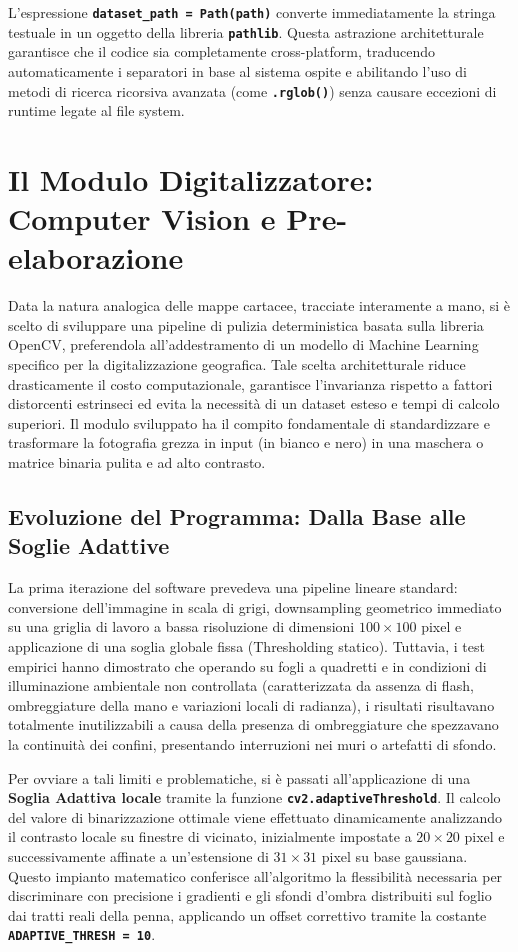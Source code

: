 \documentclass[12pt,a4paper]{article}
\begin{document}
    L'espressione \textbf{\texttt{dataset\_path = Path(path)}} converte immediatamente la stringa testuale in un oggetto della libreria \textbf{\texttt{pathlib}}. Questa astrazione architetturale garantisce che il codice sia completamente cross-platform, traducendo automaticamente i separatori in base al sistema ospite e abilitando l'uso di metodi di ricerca ricorsiva avanzata (come \textbf{\texttt{.rglob()}}) senza causare eccezioni di runtime legate al file system.

    \section{Il Modulo Digitalizzatore: Computer Vision e Pre-elaborazione}
    Data la natura analogica delle mappe cartacee, tracciate interamente a mano, si è scelto di sviluppare una pipeline di pulizia deterministica basata sulla libreria OpenCV, preferendola all'addestramento di un modello di Machine Learning specifico per la digitalizzazione geografica. Tale scelta architetturale riduce drasticamente il costo computazionale, garantisce l'invarianza rispetto a fattori distorcenti estrinseci ed evita la necessità di un dataset esteso e tempi di calcolo superiori. Il modulo sviluppato ha il compito fondamentale di standardizzare e trasformare la fotografia grezza in input (in bianco e nero) in una maschera o matrice binaria pulita e ad alto contrasto.

    \subsection{Evoluzione del Programma: Dalla Base alle Soglie Adattive}
    La prima iterazione del software prevedeva una pipeline lineare standard: conversione dell'immagine in scala di grigi, downsampling geometrico immediato su una griglia di lavoro a bassa risoluzione di dimensioni $100 \times 100$ pixel e applicazione di una soglia globale fissa (Thresholding statico). Tuttavia, i test empirici hanno dimostrato che operando su fogli a quadretti e in condizioni di illuminazione ambientale non controllata (caratterizzata da assenza di flash, ombreggiature della mano e variazioni locali di radianza), i risultati risultavano totalmente inutilizzabili a causa della presenza di ombreggiature che spezzavano la continuità dei confini, presentando interruzioni nei muri o artefatti di sfondo.
    \medskip

    Per ovviare a tali limiti e problematiche, si è passati all'applicazione di una \textbf{Soglia Adattiva locale} tramite la funzione \textbf{\texttt{cv2.adaptiveThreshold}}. Il calcolo del valore di binarizzazione ottimale viene effettuato dinamicamente analizzando il contrasto locale su finestre di vicinato, inizialmente impostate a $20 \times 20$ pixel e successivamente affinate a un'estensione di $31 \times 31$ pixel su base gaussiana. Questo impianto matematico conferisce all'algoritmo la flessibilità necessaria per discriminare con precisione i gradienti e gli sfondi d'ombra distribuiti sul foglio dai tratti reali della penna, applicando un offset correttivo tramite la costante \textbf{\texttt{ADAPTIVE\_THRESH = 10}}.
    \medskip
\end{document}
